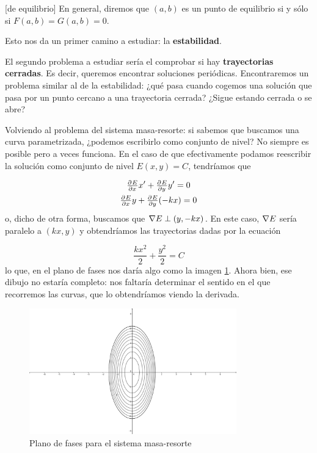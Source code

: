 \begin{definition}[de equilibrio]
En general, diremos que $(a,b)$ es un punto de equilibrio si y sólo si $F(a,b) = G(a,b) = 0$.
\end{definition}

Esto nos da un primer camino a estudiar: la \textbf{estabilidad}.

El segundo problema a estudiar sería el comprobar si hay \textbf{trayectorias cerradas}. Es decir, queremos encontrar soluciones periódicas. Encontraremos un problema similar al de la estabilidad: ¿qué pasa cuando cogemos una solución que pasa por un punto cercano a una trayectoria cerrada? ¿Sigue estando cerrada o se abre?

Volviendo al problema del sistema masa-resorte: si sabemos que buscamos una curva parametrizada, ¿podemos escribirlo como conjunto de nivel? No siempre es posible pero a veces funciona. En el caso de que efectivamente podamos reescribir la solución como conjunto de nivel $E(x,y) = C$, tendríamos que

\begin{gather*}
\pd{E}{x}  x' + \pd{E}{y}y' = 0 \\
\pd{E}{x} y + \pd{E}{y} (-kx) = 0
\end{gather*}
o, dicho de otra forma, buscamos que $\nabla E \perp (y,-kx)$. En este caso, $\nabla E$ sería paralelo a $(kx,y)$ y obtendríamos las trayectorias dadas por la ecuación

\[ \frac{kx^2}{2} + \frac{y^2}{2} = C 
\]
lo que, en el plano de fases nos daría algo como la imagen \ref{img:FasesMasaResorte}. Ahora bien, ese dibujo no estaría completo: nos faltaría determinar el sentido en el que recorremos las curvas, que lo obtendríamos viendo la derivada.

\begin{figure}[hbtp]
\centering
\includegraphics[width=0.8\textwidth]{img/PlanoFasesMasaResorte.png}
\caption{Plano de fases para el sistema masa-resorte}
\label{img:FasesMasaResorte}
\end{figure}


